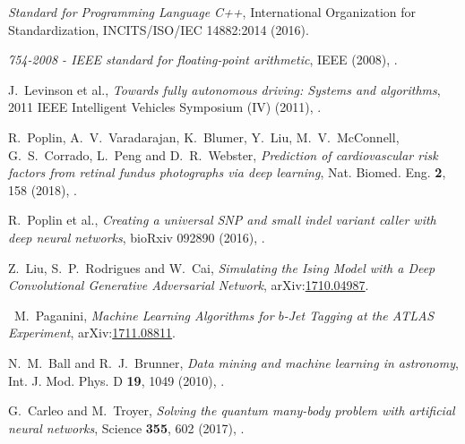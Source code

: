 \documentclass[11pt, a4paper]{report} %
\begin{document}
\begin{thebibliography}{99}
\textit{Standard for Programming Language C++}, International Organization for Standardization, INCITS/ISO/IEC 14882:2014 (2016).






\emph{754-2008 - {IEEE} standard for floating-point arithmetic}, IEEE (2008), .




J.~Levinson et al., \textit{Towards fully autonomous driving: Systems and algorithms}, 2011 IEEE Intelligent Vehicles Symposium (IV) (2011), .




R.~Poplin, A.~V.~Varadarajan, K.~Blumer, Y.~Liu, M.~V.~McConnell, G.~S.~Corrado, L.~Peng and D.~R.~Webster, \textit{Prediction of cardiovascular risk factors from retinal fundus photographs via deep learning}, Nat. Biomed. Eng. \textbf{2}, 158 (2018), .




R.~Poplin et al., \textit{Creating a universal SNP and small indel variant caller with deep neural networks}, bioRxiv 092890 (2016), .




Z.~Liu, S.~P.~Rodrigues and W.~Cai, \textit{Simulating the Ising Model with a Deep Convolutional Generative Adversarial Network}, arXiv:\href{https://arxiv.org/abs/1710.04987}{1710.04987}.



 \
M.~Paganini, \textit{Machine Learning Algorithms for $b$-Jet Tagging at the ATLAS Experiment}, arXiv:\href{https://arxiv.org/abs/1711.08811}{1711.08811}. 



N.~M.~Ball and R.~J.~Brunner, \textit{Data mining and machine learning in astronomy}, Int. J. Mod. Phys. D \textbf{19}, 1049 (2010), .




G.~Carleo and M.~Troyer, \textit{Solving the quantum many-body problem with artificial neural networks}, Science \textbf{355}, 602 (2017), .





\end{thebibliography}
\end{document}

